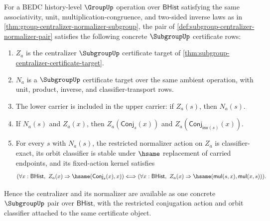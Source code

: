 \begin{theorem}
\label{thm:subgroup-centralizer-normalizer-pair-certificate}
For a BEDC history-level $\GroupUp$ operation over $\mathsf{BHist}$ satisfying
the same associativity, unit, multiplication-congruence, and two-sided inverse
laws as in
\autoref{thm:group-centralizer-normalizer-subgroup}, the pair of
\autoref{def:subgroup-centralizer-normalizer-pair} satisfies the following
concrete $\SubgroupUp$ certificate rows:
\begin{enumerate}
\item $Z_a$ is the centralizer $\SubgroupUp$ certificate target of
\autoref{thm:subgroup-centralizer-certificate-target}.
\item $N_a$ is a $\SubgroupUp$ certificate target over the same ambient
operation, with unit, product, inverse, and classifier-transport rows.
\item The lower carrier is included in the upper carrier: if $Z_a(s)$, then
$N_a(s)$.
\item If $N_a(s)$ and $Z_a(x)$, then
$Z_a(\mathsf{Conj}_s(x))$ and
$Z_a(\mathsf{Conj}_{\mathsf{inv}(s)}(x))$.
\item For every $s$ with $N_a(s)$, the restricted normalizer action on $Z_a$
is classifier-exact, its orbit classifier is stable under $\hsame$ replacement
of carried endpoints, and its fixed-action kernel satisfies
$$
(\forall x:\mathsf{BHist},\ Z_a(x)\Rightarrow
\hsame(\mathsf{Conj}_s(x),x))
\Longleftrightarrow
(\forall x:\mathsf{BHist},\ Z_a(x)\Rightarrow
\hsame(\mathsf{mul}(s,x),\mathsf{mul}(x,s))).
$$
\end{enumerate}
Hence the centralizer and its normalizer are available as one concrete
$\SubgroupUp$ pair over $\mathsf{BHist}$, with the restricted conjugation
action and orbit classifier attached to the same certificate object.
\end{theorem}
